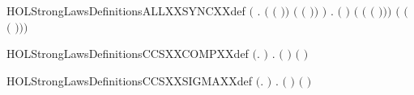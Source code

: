 \newcommand{\HOLStrongLawsDate}{04 Settembre 2019}
\newcommand{\HOLStrongLawsTime}{15:57}
\begin{SaveVerbatim}{HOLStrongLawsDefinitionsALLXXSYNCXXdef}
\HOLTokenTurnstile{} \ensuremath{(}\HOLSymConst{\HOLTokenForall{}}  .
             \HOLSymConst{\ensuremath{=}}
         \ensuremath{(} \ensuremath{(} \ensuremath{)}\ensuremath{)} \ensuremath{(} \ensuremath{(} \ensuremath{)}\ensuremath{)}  \ensuremath{)} \HOLSymConst{\HOLTokenConj{}}
   \HOLSymConst{\HOLTokenForall{}}   .
         \ensuremath{(} \ensuremath{)}   \HOLSymConst{\ensuremath{=}}
            \HOLSymConst{\ensuremath{+}}
        \ensuremath{(} \ensuremath{(} \ensuremath{(} \ensuremath{)}\ensuremath{)}\ensuremath{)} \ensuremath{(} \ensuremath{(} \ensuremath{(} \ensuremath{)}\ensuremath{)}\ensuremath{)}  
\end{SaveVerbatim}
\newcommand{\HOLStrongLawsDefinitionsALLXXSYNCXXdef}{\UseVerbatim{HOLStrongLawsDefinitionsALLXXSYNCXXdef}}
\begin{SaveVerbatim}{HOLStrongLawsDefinitionsCCSXXCOMPXXdef}
\HOLTokenTurnstile{} \ensuremath{(}\HOLSymConst{\HOLTokenForall{}}.    \HOLSymConst{\ensuremath{=}}  \ensuremath{)} \HOLSymConst{\HOLTokenConj{}} \HOLSymConst{\HOLTokenForall{}} .   \ensuremath{(} \ensuremath{)} \HOLSymConst{\ensuremath{=}}    \HOLSymConst{\ensuremath{\mid}}  \ensuremath{(} \ensuremath{)}
\end{SaveVerbatim}
\newcommand{\HOLStrongLawsDefinitionsCCSXXCOMPXXdef}{\UseVerbatim{HOLStrongLawsDefinitionsCCSXXCOMPXXdef}}
\begin{SaveVerbatim}{HOLStrongLawsDefinitionsCCSXXSIGMAXXdef}
\HOLTokenTurnstile{} \ensuremath{(}\HOLSymConst{\HOLTokenForall{}}.    \HOLSymConst{\ensuremath{=}}  \ensuremath{)} \HOLSymConst{\HOLTokenConj{}}
   \HOLSymConst{\HOLTokenForall{}} .   \ensuremath{(} \ensuremath{)} \HOLSymConst{\ensuremath{=}}    \HOLSymConst{\ensuremath{+}}  \ensuremath{(} \ensuremath{)}
\end{SaveVerbatim}
